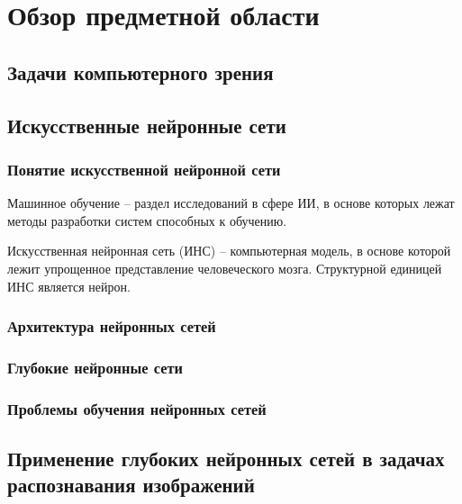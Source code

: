 \section{Обзор предметной области}

\subsection{Задачи компьютерного зрения}

\subsection{Искусственные нейронные сети}

\subsubsection{Понятие искусственной нейронной сети}

Машинное обучение – раздел исследований в сфере ИИ, в основе которых лежат методы разработки систем способных к обучению.

Искусственная нейронная сеть (ИНС) – компьютерная модель, в основе которой лежит упрощенное представление человеческого мозга. Структурной единицей ИНС является нейрон. 



\subsubsection{Архитектура нейронных сетей}

\subsubsection{Глубокие нейронные сети}

\subsubsection{Проблемы обучения нейронных сетей}

\subsection{Применение глубоких нейронных сетей в задачах распознавания изображений}

\clearpage